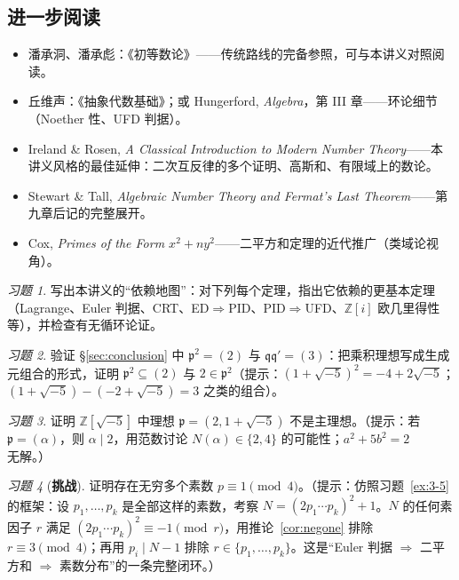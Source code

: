 \documentclass[a4paper,11pt]{ctexart}
\numberwithin{equation}{section}
\theoremstyle{plain}
\theoremstyle{definition}
\theoremstyle{remark}
\newtheorem{exercise}{习题}[section]
\newcommand{\Ga}{\mathbb{Z}[i]}
\newcommand{\Gf}{\mathbb{Z}[\sqrt{-5}]}
\begin{document}
\subsection{进一步阅读}

\begin{itemize}[itemsep=0.15em]
  \item 潘承洞、潘承彪：《初等数论》——传统路线的完备参照，可与本讲义对照阅读。
  \item 丘维声：《抽象代数基础》；或 Hungerford, \emph{Algebra}，第 III 章——环论细节（Noether 性、UFD 判据）。
  \item Ireland \& Rosen, \emph{A Classical Introduction to Modern Number Theory}——本讲义风格的最佳延伸：二次互反律的多个证明、高斯和、有限域上的数论。
  \item Stewart \& Tall, \emph{Algebraic Number Theory and Fermat's Last Theorem}——第九章后记的完整展开。
  \item Cox, \emph{Primes of the Form $x^2+ny^2$}——二平方和定理的近代推广（类域论视角）。
\end{itemize}

\begin{exercise}\label{ex:9-1}
写出本讲义的“依赖地图”：对下列每个定理，指出它依赖的更基本定理（Lagrange、Euler 判据、CRT、ED$\Rightarrow$PID、PID$\Rightarrow$UFD、$\Ga$ 欧几里得性等），并检查有无循环论证。
\end{exercise}

\begin{exercise}\label{ex:9-2}
验证 \S\ref{sec:conclusion} 中 $\mathfrak p^2=(2)$ 与 $\mathfrak q\mathfrak q'=(3)$：把乘积理想写成生成元组合的形式，证明 $\mathfrak p^2\subseteq(2)$ 与 $2\in\mathfrak p^2$（提示：$(1+\sqrt{-5})^2=-4+2\sqrt{-5}$；$(1+\sqrt{-5})-( -2+\sqrt{-5})=3$ 之类的组合）。
\end{exercise}

\begin{exercise}\label{ex:9-3}
证明 $\Gf$ 中理想 $\mathfrak p=(2,1+\sqrt{-5})$ 不是主理想。（提示：若 $\mathfrak p=(\alpha)$，则 $\alpha\mid 2$，用范数讨论 $N(\alpha)\in\{2,4\}$ 的可能性；$a^2+5b^2=2$ 无解。）
\end{exercise}

\begin{exercise}[\textbf{挑战}]\label{ex:9-4}
证明存在无穷多个素数 $p\equiv1\pmod4$。（提示：仿照习题~\ref{ex:3-5} 的框架：设 $p_1,\dots,p_k$ 是全部这样的素数，考察 $N=(2p_1\cdots p_k)^2+1$。$N$ 的任何素因子 $r$ 满足 $(2p_1\cdots p_k)^2\equiv-1\pmod r$，用推论~\ref{cor:negone} 排除 $r\equiv3\pmod4$；再用 $p_i\mid N-1$ 排除 $r\in\{p_1,\dots,p_k\}$。这是“Euler 判据 $\Rightarrow$ 二平方和 $\Rightarrow$ 素数分布”的一条完整闭环。）
\end{exercise}
\end{document}
